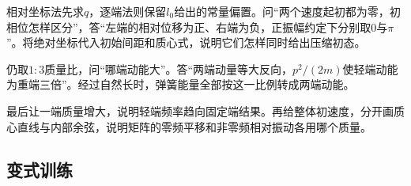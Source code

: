 \documentclass[UTF8,fontset=fandol,a4paper,11pt]{ctexart}
\begin{document}
相对坐标法先求$q$，逐端法则保留$l_0$给出的常量偏置。问“两个速度起初都为零，初相位怎样区分”，答“左端的相对位移为正、右端为负，正振幅约定下分别取0与$\pi$”。将绝对坐标代入初始间距和质心式，说明它们怎样同时给出压缩初态。

仍取$1:3$质量比，问“哪端动能大”。答“两端动量等大反向，$p^2/(2m)$使轻端动能为重端三倍”。经过自然长时，弹簧能量全部按这一比例转成两端动能。

最后让一端质量增大，说明轻端频率趋向固定端结果。再给整体初速度，分开画质心直线与内部余弦，说明矩阵的零频平移和非零频相对振动各用哪个质量。




\subsection*{变式训练}
\end{document}
